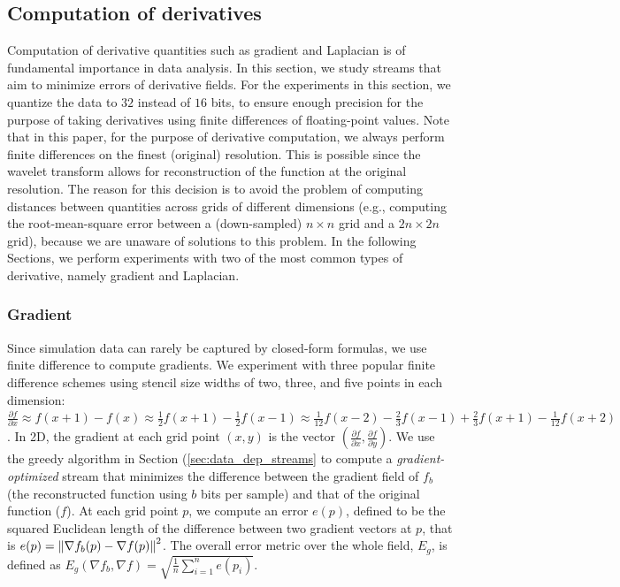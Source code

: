 \subsection{Computation of derivatives}
\label{sec:derivatives}

Computation of derivative quantities such as gradient and Laplacian is of fundamental importance in
data analysis. In this section, we study streams that aim to minimize errors of derivative fields.
For the experiments in this section, we quantize the data to $32$ instead of $16$ bits, to ensure
enough precision for the purpose of taking derivatives using finite differences of floating-point
values. Note that in this paper, for the purpose of derivative computation, we always perform finite
differences on the finest (original) resolution. This is possible since the wavelet transform allows
for reconstruction of the function at the original resolution. The reason for this decision is to
avoid the problem of computing distances between quantities across grids of different dimensions
(e.g., computing the root-mean-square error between a (down-sampled) $n\times n$ grid and a
$2n\times 2n$ grid), because we are unaware of solutions to this problem. In the following Sections,
we perform experiments with two of the most common types of derivative, namely gradient and
Laplacian.

\subsubsection{Gradient}
\label{sec:gradient}

Since simulation data can rarely be captured by closed-form formulas, we use finite difference to
compute gradients. We experiment with three popular finite difference schemes using stencil size
widths of two, three, and five points in each dimension: $\frac{\partial f}{\partial x}\approx
f(x+1)-f(x)
\approx \frac{1}{2}f(x+1)-\frac{1}{2}f(x-1) \approx
\frac{1}{12}f(x-2)-\frac{2}{3}f(x-1)+\frac{2}{3}f(x+1)-\frac{1}{12}f(x+2)$. In 2D, the gradient at
each grid point $(x,y)$ is the vector $(\frac{\partial f}{\partial x},\frac{\partial f}{\partial
y})$. We use the greedy algorithm in Section (\ref{sec:data_dep_streams} to compute a
\emph{gradient-optimized} stream that minimizes the difference between the gradient field of $f_b$
(the reconstructed function using $b$ bits per sample) and that of the original function ($f$). At
each grid point $p$, we compute an error $e(p)$, defined to be the squared Euclidean length of the
difference between two gradient vectors at $p$, that is $e(p)=\left\lVert\nabla f_b(p)-\nabla f(p)\right\rVert^2$.
The overall error metric over the whole field, $E_g$, is defined as $E_g(\nabla f_b,\nabla
f)=\sqrt{\frac{1}{n}\sum_{i=1}^{n}{e(p_i)}}$.


